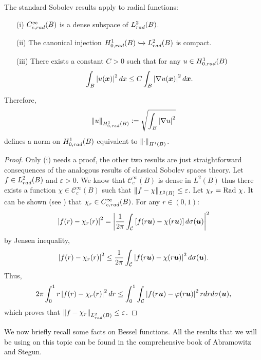 \documentclass[11pt,a4paper]{article}
\begin{document}
The standard Sobolev results apply to radial functions:

\begin{Prop} \text{ }\label{SobolevRadialResults}
	\begin{itemize}
		\item[(i)] $C^\infty_{c,rad}(B)$ is a dense subspace of $L^2_{rad}(B)$. 
		\item[(ii)] The canonical injection $H^1_{0,rad}(B) \xhookrightarrow{} L^2_{rad}(B)$ is compact.
		\item[(iii)] There exists a constant $C > 0$ such that for any $u \in H^1_{0,rad}(B)$
		      \begin{equation}
		      	\label{inegaliteDePoincare}
		      	\int_{B}\left\lvert u(\boldsymbol{x}) \right\rvert^2dx \leq C \int_B\left\lvert \nabla u (\boldsymbol{x}) \right\rvert^2d\boldsymbol{x}.
		      \end{equation}
	\end{itemize}
\end{Prop}
\noindent Therefore, 
\[ \left\|u\right\|_{H^1_{0,rad}(B)} \mathrel{\mathop:}= \sqrt{\int_B \left\lvert \nabla u \right\rvert^2}\]
defines a norm on $H^1_{0,rad}(B)$ equivalent to $\left\|\cdot\right\|_{H^1(B)}$.
\begin{proof}
	Only (i) needs a proof, the other two results are just straightforward consequences of the analogous results of classical Sobolev spaces theory.
	Let $f \in L^2_{rad}(B)$ and $\varepsilon >0$. We know that $\mathcal{C}_c^\infty(B)$ is dense in $L^2(B)$ thus there exists a function $\chi \in \mathcal{C}_c^\infty(B)$ such that $\left\|f - \chi\right\|_{L^2(B)} \leq \varepsilon$. Let $\chi_r = \textup{Rad }\chi$. It can be shown (see \cite{SphericalAverage}) that $\chi_r \in C^\infty_{c,rad}(B)$.
	For any $r \in (0,1)$: 
	\[\left\lvert f(r) - \chi_r(r) \right\rvert^2 = \left\lvert \frac{1}{2\pi} \int_{\mathcal{C}} \left[f(r\boldsymbol{u}) - \chi(r \boldsymbol{u})\right]d\sigma(\boldsymbol{u}) \right\rvert^2 \]
	by Jensen inequality, 
	\[\left|f(r) - \chi_r(r)\right|^2 \leq \frac{1}{2\pi} \int_{\mathcal{C}}\left|f(r\boldsymbol{u}) - \chi(r\boldsymbol{u}) \right|^2 d\sigma({\boldsymbol{u}}).\]
	Thus, \[ 2\pi \int_{0}^1 r \left\lvert  f(r) - \chi_r(r) \right\rvert^2 dr \leq \int_{0}^1 \int_{\mathcal{C}}\left| f(r\boldsymbol{u}) - \varphi(r\boldsymbol{u})\right|^2 r dr d\sigma(\boldsymbol{u}),\]
	which proves that $\left\|f - \chi_r\right\|_{L^2_{rad}(B)} \leq \varepsilon$.\qedhere
\end{proof}
We now briefly recall some facts on Bessel functions. All the results that we will be using on this topic can be found in the comprehensive book \cite{abramowitz1964handbook} of Abramowitz and Stegun. 
\end{document}
